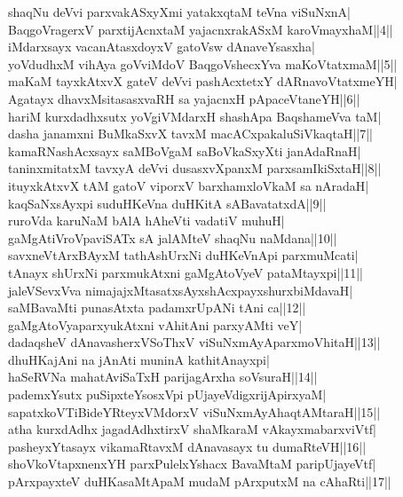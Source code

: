 \documentclass{article}
\begin{document}
shaqNu deVvi parxvakASxyXmi yatakxqtaM teVna viSuNxnA|\\
BaqgoVragerxV parxtijAcnxtaM yajacnxrakASxM karoVmayxhaM||4||\\
iMdarxsayx vacanAtasxdoyxV gatoVsw dAnaveYsasxha|\\
yoVdudhxM vihAya goVviMdoV BaqgoVshecxYva maKoVtatxmaM||5||\\
maKaM tayxkAtxvX gateV deVvi pashAcxtetxY dARnavoVtatxmeYH|\\
Agatayx dhavxMsitasasxvaRH sa yajacnxH pApaceVtaneYH||6||\\
hariM kurxdadhxsutx yoVgiVMdarxH shashApa BaqshameVva taM|\\
dasha janamxni BuMkaSxvX tavxM macACxpakaluSiVkaqtaH||7||\\
kamaRNashAcxsayx saMBoVgaM saBoVkaSxyXti janAdaRnaH|\\
taninxmitatxM tavxyA deVvi dusasxvXpanxM parxsamIkiSxtaH||8||\\
ituyxkAtxvX tAM gatoV viporxV barxhamxloVkaM sa nAradaH|\\
kaqSaNxsAyxpi suduHKeVna duHKitA sABavatatxdA||9||\\
ruroVda karuNaM bAlA hAheVti vadatiV muhuH|\\
gaMgAtiVroVpaviSATx sA jalAMteV shaqNu naMdana||10||\\
savxneVtArxBAyxM tathAshUrxNi duHKeVnApi parxmuMcati|\\
tAnayx shUrxNi parxmukAtxni gaMgAtoVyeV pataMtayxpi||11||\\
jaleVSevxVva nimajajxMtasatxsAyxshAcxpayxshurxbiMdavaH|\\
saMBavaMti punasAtxta padamxrUpANi tAni ca||12||\\
gaMgAtoVyaparxyukAtxni vAhitAni parxyAMti veY|\\
dadaqsheV dAnavasherxVSoThxV viSuNxmAyAparxmoVhitaH||13||\\
dhuHKajAni na jAnAti muninA kathitAnayxpi|\\
haSeRVNa mahatAviSaTxH parijagArxha soVsuraH||14||\\
pademxYsutx puSipxteYsosxVpi pUjayeVdigxrijApirxyaM|\\
sapatxkoVTiBideYRteyxVMdorxV viSuNxmAyAhaqtAMtaraH||15||\\
atha kurxdAdhx jagadAdhxtirxV shaMkaraM vAkayxmabarxviVtf|\\
pasheyxYtasayx vikamaRtavxM dAnavasayx tu dumaRteVH||16||\\
shoVkoVtapxnenxYH parxPulelxYshacx BavaMtaM paripUjayeVtf|\\
pArxpayxteV duHKasaMtApaM mudaM pArxputxM na cAhaRti||17||\\
\end{document}
